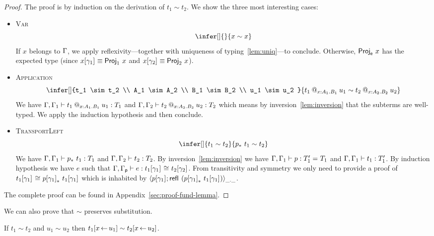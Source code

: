 \begin{proof}
  The proof is by induction on the derivation of $t_1 \sim t_2$. We show
  the three most interesting cases:

  \begin{itemize}
  \item \textsc{Var}
    \[
      \infer[]
        { }
        {x \sim x}
    \]
    If $x$ belongs to $\Ga$, we apply reflexivity---together with uniqueness of
    typing~\eqref{lem:uniq}---to conclude.
    Otherwise, $\ProjE{x}$ has the expected type (since
    $\llift{\gamma}{}{x} \equiv \ProjO{x}$ and $\rlift{\gamma}{}{x} \equiv \ProjT{x}$).

  \item \textsc{Application}
    \[
      \infer[]
        {t_1 \sim t_2 \\
         A_1 \sim A_2 \\
         B_1 \sim B_2 \\
         u_1 \sim u_2
        }
        {\app{t_1}{x:A_1}{B_1}{u_1} \sim \app{t_2}{x:A_2}{B_2}{u_2}}
    \]
    We have $\isterm{\Ga, \Ga_1}{\app{t_1}{x:A_1}{B_1}{u_1}}{T_1}$ and
    $\isterm{\Ga, \Ga_2}{\app{t_2}{x:A_2}{B_2}{u_2}}{T_2}$ which means by
    inversion~\eqref{lem:inversion} that the subterms are well-typed.
    We apply the induction hypothesis and then conclude.
  \item \textsc{TransportLeft}
    \[
      \infer[]
        {t_1 \sim t_2}
        {\translpo{p}\ t_1 \sim t_2}
    \]
    We have $\isterm{\Ga, \Ga_1}{\translpo{p}\ t_1}{T_1}$ and
    $\isterm{\Ga, \Ga_2}{t_2}{T_2}$.
    By inversion~\eqref{lem:inversion} we have
    $\isterm{\Ga, \Ga_1}{p}{\Eq{}{T_1'}{T_1}}$ and
    $\isterm{\Ga, \Ga_1}{t_1}{T_1'}$.
    By induction hypothesis we have $e$ such that
    $\isterm{\Ga, \Gp}{e}{\Heq{}{\llift{\gamma}{}{t_1}}{}{\rlift{\gamma}{}{t_2}}}$.
    From transitivity and symmetry we only need to provide a proof of
    $\Heq{}{\llift{\gamma}{}{t_1}}{}{\translpo{\llift{\gamma}{}{p}}\ \llift{\gamma}{}{t_1}}$ which is inhabited by
    $\pair{\_}{\_}{\llift{\gamma}{}{p}}{\refl{} (\translpo{\llift{\gamma}{}{p}}\ \llift{\gamma}{}{t_1})}$.
  \end{itemize}

  The complete proof can be found in Appendix~\ref{sec:proof-fund-lemma}.
\end{proof}

We can also prove that $\sim$ preserves substitution.

\begin{lemma}
  If $t_1 \sim t_2$ and $u_1 \sim u_2$ then
  $t_1[x \sto u_1] \sim t_2[x \sto u_2]$.
\end{lemma}

